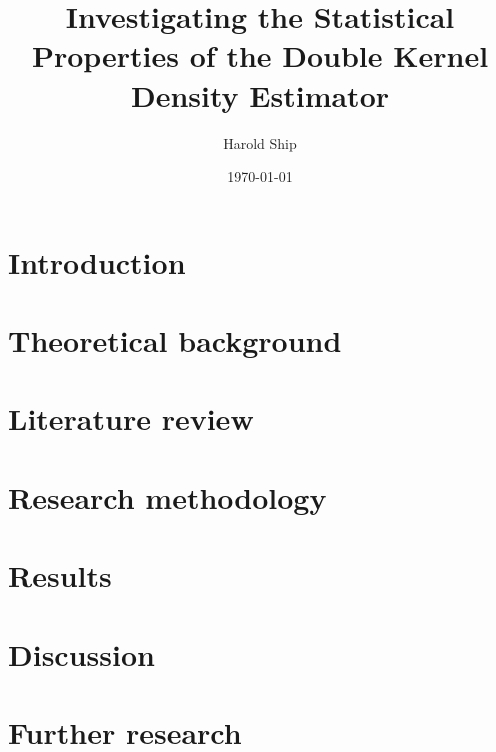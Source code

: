 \documentclass[a4paper,12pt,titlepage,twoside,openany]{book}
\title{Investigating the Statistical Properties of the Double Kernel Density Estimator}
\author{Harold Ship}
\date{\today}
\begin{document}
\lstset{language=R}

\frontmatter                            %
\maketitle                              %
\tableofcontents                        %

\clearpage
\listoftables
\clearpage
\listoffigures
\printglossaries

\mainmatter                             %

\chapter{Introduction}
\label{ch:introduction}


\chapter{Theoretical background}
\label{ch:theory}


\chapter{Literature review}
\label{ch:literature}


\chapter{Research methodology}
\label{ch:method}


\chapter{Results}
\label{ch:results}


\chapter{Discussion}
\label{ch:discussion}


\chapter{Further research}
\label{ch:further}

\end{document}
